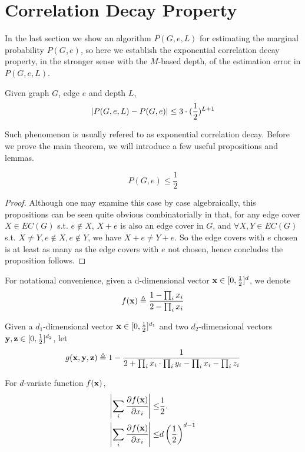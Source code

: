 \section{Correlation Decay Property}

In the last section we show an algorithm $P(G,e,L)$ for estimating the marginal probability $P(G,e)$,
so here we establish the exponential correlation decay property, in the stronger sense with the $M$-based depth, of the estimation error in $P(G,e,L)$.%

\begin{Thm}
	Given graph $G$, edge $e$ and depth $L$,
	\[\left\vert P(G,e,L) - P(G,e)\right\vert \leq 3\cdot(\frac{1}{2})^{L+1}\]
\end{Thm}

Such phenomenon is usually refered to as exponential correlation decay. Before we prove the main theorem, we will introduce a few useful propositions and lemmas.

\begin{Prop}
	\[P(G, e) \leq \frac{1}{2}\]
\end{Prop}

\begin{proof}
	Although one may examine this case by case algebraically, this propositions can be seen quite obvious combinatorially in that, for any edge cover $X \in EC(G)$ s.t. $e \notin X$, $X+e$ is also an edge cover in $G$, and $\forall X,Y \in EC(G)$ s.t. $X \neq Y, e \notin X, e\notin Y$, we have $X+e \neq Y+e$. So the edge covers with $e$ chosen is at least as many as the edge covers with $e$ not chosen, hence concludes the proposition follows.
\end{proof}

For notational convenience, given a d-dimensional vector ${\bf x} \in [0, \frac{1}{2}]^d$, we denote
\[ f({\bf x}) \triangleq \frac{1- \prod_i x_i}{2 - \prod_i x_i}\]

Given a $d_1$-dimensional vector ${\bf x} \in [0, \frac{1}{2}]^{d_1}$ and two $d_2$-dimensional vectors ${\bf y,z} \in [0, \frac{1}{2}]^{d_2}$, let
\[ g({\bf x,y,z}) \triangleq  1- \frac{1}{2+\prod_i x_i \cdot \prod_i y_i - \prod_i x_i - \prod_i z_i} \]


	\begin{Lem}
		For $d$-variate function $f({\bf x})$,
		\begin{align*}
			\left\vert\sum_i \cfrac{\partial f({\bf x})}{\partial x_i}\right\vert \leq & \frac{1}{2}. \\
			\left\vert\sum_i \cfrac{\partial f({\bf x})}{\partial x_i}\right\vert \leq & d \left( \frac{1}{2} \right)^{d-1}
		\end{align*}
	\end{Lem}

